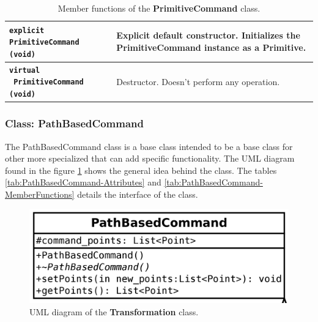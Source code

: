 \documentclass[11pt,twoside,openany,x11names,svgnames]{memoir}
\begin{document}
\begin{table}[h]\footnotesize
\centering
\begin{tabular}{| >{\bfseries}p{8.5cm} | p{7cm} |}
	\hline
	
	\texttt{explicit PrimitiveCommand (void)} & Explicit default constructor. Initializes the PrimitiveCommand instance as a Primitive. \\
	
	\hline
	
	\texttt{virtual ~PrimitiveCommand (void)} & Destructor. Doesn't perform any operation. \\
	
	\hline
	
\end{tabular}
\caption{Member functions of the \textbf{PrimitiveCommand} class.}
\label{tab:PrimitiveCommand-MemberFunctions}
\end{table}

\clearpage

\subsubsection{Class: PathBasedCommand}\label{Class-PathBasedCommand}

The PathBasedCommand class is a base class intended to be a base class for other more specialized that can add specific functionality. The UML diagram found in the figure \ref{fig:class-path-based-command} shows the general idea behind the class. The tables \ref{tab:PathBasedCommand-Attributes} and \ref{tab:PathBasedCommand-MemberFunctions} details the interface of the class.

\begin{figure}
	\centering
	\includegraphics[scale=0.2, clip=true, trim= 0pt 0pt 0pt 0pt]{images/chapter03-image18}
	\caption{UML diagram of the \textbf{Transformation} class.}
	\label{fig:class-path-based-command}
\end{figure}
\end{document}
